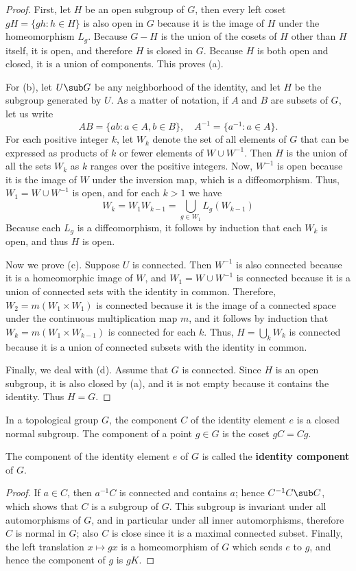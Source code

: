 \begin{proof}
First, let $H$ be an open subgroup of $G$, then every left coset $gH=\{gh:h\in H\}$ is also open in $G$ because it is the image of $H$ under the homeomorphism $L_g$. Because $G-H$ is the union of the cosets of $H$ other than $H$ itself, it is open, and therefore $H$ is closed in $G$. Because $H$ is both open and closed, it is a union of components. This proves (a).\par
For (b), let $U\sub G$ be any neighborhood of the identity, and let $H$ be the subgroup generated by $U$. As a matter of notation, if $A$ and $B$ are subsets of $G$, let us write
\[AB=\{ab:a\in A,b\in B\},\quad A^{-1}=\{a^{-1}:a\in A\}.\]
For each positive integer $k$, let $W_k$ denote the set of all elements of $G$ that can be expressed as products of $k$ or fewer elements of $W\cup W^{-1}$. Then $H$ is the union of all the sets $W_k$ as $k$ ranges over the positive integers. Now, $W^{-1}$ is open because it is the image of $W$ under the inversion map, which is a diffeomorphism. Thus, $W_1=W\cup W^{-1}$ is open, and for each $k>1$ we have
\[W_k=W_1W_{k-1}=\bigcup_{g\in W_1}L_g(W_{k-1})\]
Because each $L_g$ is a diffeomorphism, it follows by induction that each $W_k$ is open, and thus $H$ is open.\par
Now we prove (c). Suppose $U$ is connected. Then $W^{-1}$ is also connected because it is a homeomorphic image of $W$, and $W_1=W\cup W^{-1}$ is connected because it is a union of connected sets with the identity in common. Therefore, $W_2=m(W_1\times W_1)$ is connected because it is the image of a connected space under the continuous multiplication map $m$, and it follows by induction that $W_k=m(W_1\times W_{k-1})$ is connected for each $k$. Thus, $H=\bigcup_kW_k$ is connected because it is a union of connected subsets with the identity in common.\par
Finally, we deal with (d). Assume that $G$ is connected. Since $H$ is an open subgroup, it is also closed by (a), and it is not empty because it contains the identity. Thus $H=G$.
\end{proof}
\begin{proposition}\label{topological group identity component normal closed}
In a topological group $G$, the component $C$ of the identity element $e$ is a closed normal subgroup. The component of a point $g\in G$ is the coset $gC=Cg$.
\end{proposition}
The component of the identity element $e$ of $G$ is called the \textbf{identity component} of $G$.
\begin{proof}
If $a\in C$, then $a^{-1}C$ is connected and contains $a$; hence $C^{-1}C\sub C$, which shows that $C$ is a subgroup of $G$. This subgroup is invariant under all automorphisms of $G$, and in particular under all inner automorphisms, therefore $C$ is normal in $G$; also $C$ is close since it is a maximal connected subset. Finally, the left translation $x\mapsto gx$ is a homeomorphism of $G$ which sends $e$ to $g$, and hence the component of $g$ is $gK$.
\end{proof}
